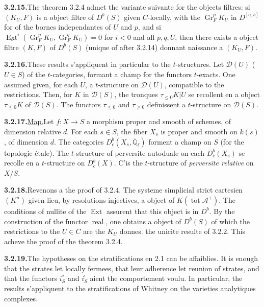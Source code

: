 \documentclass[12pt,a4paper]{article}
\theoremstyle{plain}
\theoremstyle{definition}
\DeclareMathOperator{\Ext}{Ext}
\DeclareMathOperator{\real}{real}
\DeclareMathOperator{\Gr}{Gr}
\DeclareMathOperator{\tot}{tot}
\begin{document}
\smallskip
\noindent\textbf{3.2.15.}\quad The theorem 3.2.4 admet the variante suivante for the objects filtres: si $(K_U, F)$ is a object filtre of $D^b(S)$ given $C$-locally, with the $\Gr_F^p K_U$ in $D^{[a,b]}$ for of the bornes independantes of $U$ and $p$, and si $\underline{\Ext}^i(\Gr_F^p K_U, \Gr_F^q K_U) = 0$ for $i < 0$ and all $p, q, U$, then there exists a object filtre $(K, F)$ of $D^b(S)$ (unique of after 3.2.14) donnant naissance a $(K_U, F)$.

\smallskip
\noindent\textbf{3.2.16.}\quad These results s'appliquent in particular to the $t$-structures. Let $\mathcal{D}(U)$ ($U \in S$) of the $t$-categories, formant a champ for the functors $t$-exacts. One assumed given, for each $U$, a $t$-structure on $\mathcal{D}(U)$, compatible to the restrictions. Then, for $K$ in $\mathcal{D}(S)$, the tronques $\tau_{\leqslant 0} K|U$ se recollent en a object $\tau_{\leqslant 0} K$ of $\mathcal{D}(S)$. The functors $\tau_{\leqslant 0}$ and $\tau_{\geqslant 0}$ definissent a $t$-structure on $\mathcal{D}(S)$.

\smallskip
\noindent\textbf{3.2.17.}\quad \underline{Map.}\quad Let $f : X \to S$ a morphism proper and smooth of schemes, of dimension relative $d$. For each $s \in S$, the fiber $X_s$ is proper and smooth on $k(s)$, of dimension $d$. The categories $D_c^b(X_s, \overline{\mathbb{Q}}_\ell)$ forment a champ on $S$ (for the topologie étale). The $t$-structure of perversite autoduale on each $D_c^b(X_s)$ se recolle en a $t$-structure on $D_c^b(X)$. C'is the $t$-structure of \emph{perversite relative} on $X/S$.

\smallskip
\noindent\textbf{3.2.18.}\quad Revenons a the proof of 3.2.4. The systeme simplicial strict cartesien $(K^n)$ given lieu, by resolutions injectives, a object of $K(\tot \mathcal{A}^+)$. The conditions of nullite of the $\Ext$ assurent that this object is in $D^b$. By the construction of the functor $\real$, one obtains a object of $D^b(S)$ of which the restrictions to the $U \in C$ are the $K_U$ donnes. the unicite resulte of 3.2.2. This acheve the proof of the theorem 3.2.4.

\smallskip
\noindent\textbf{3.2.19.}\quad The hypotheses on the stratifications en 2.1 can be affaiblies. It is enough that the strates let locally fermees, that leur adherence let reunion of strates, and that the functors $i_S^*$ and $i_S^!$ aient the comportement voulu. In particular, the results s'appliquent to the stratifications of Whitney on the varieties analytiques complexes.
\end{document}
